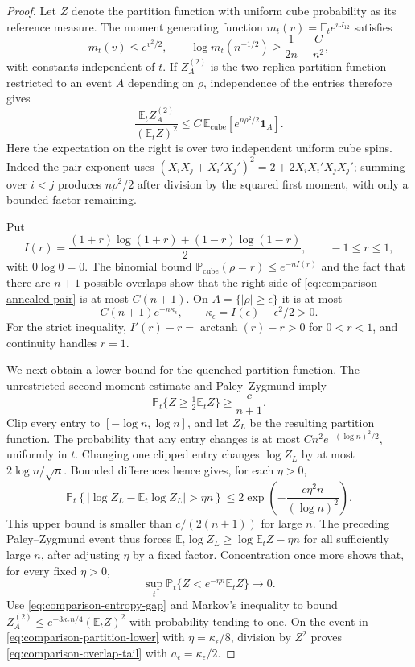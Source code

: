 \begin{proof}
Let $Z$ denote the partition function with uniform cube probability as its
reference measure.  The moment generating function
$m_t(v)=\mathbb E_t e^{vJ_{12}}$ satisfies
\[
 m_t(v)\le e^{v^2/2},\qquad
 \log m_t(n^{-1/2})\ge\frac1{2n}-\frac C{n^2},
\]
with constants independent of $t$.  If $Z_A^{(2)}$ is the two-replica
partition function restricted to an event $A$ depending on $\rho$, independence
of the entries therefore gives
\begin{equation}\label{eq:comparison-annealed-pair}
 \frac{\mathbb E_t Z_A^{(2)}}{(\mathbb E_tZ)^2}
 \le C\,\mathbb E_{\mathrm{cube}}\!\left[
             e^{n\rho^2/2}\mathbf1_A\right].
\end{equation}
Here the expectation on the right is over two independent uniform cube spins.
Indeed the pair exponent uses
$(X_iX_j+X_i'X_j')^2=2+2X_iX_i'X_jX_j'$; summing over $i<j$ produces
$n\rho^2/2$ after division by the squared first moment, with only a bounded
factor remaining.

Put
\[
 I(r)=\frac{(1+r)\log(1+r)+(1-r)\log(1-r)}2,
 \qquad -1\le r\le1,
\]
with $0\log0=0$.  The binomial bound
$\mathbb P_{\mathrm{cube}}(\rho=r)\le e^{-nI(r)}$ and the fact that there
are $n+1$ possible overlaps show that the right side of
\eqref{eq:comparison-annealed-pair} is at most $C(n+1)$.  On
$A=\{|\rho|\ge\epsilon\}$ it is at most
\begin{equation}\label{eq:comparison-entropy-gap}
 C(n+1)e^{-n\kappa_\epsilon},\qquad
 \kappa_\epsilon=I(\epsilon)-\epsilon^2/2>0.
\end{equation}
For the strict inequality, $I'(r)-r=\operatorname{arctanh}(r)-r>0$ for
$0<r<1$, and continuity handles $r=1$.

We next obtain a lower bound for the quenched partition function.  The
unrestricted second-moment estimate and Paley--Zygmund imply
\[
 \mathbb P_t\{Z\ge\tfrac12\mathbb E_t Z\}\ge\frac c{n+1}.
\]
Clip every entry to $[-\log n,\log n]$, and let $Z_L$ be the resulting
partition function.  The probability that any entry changes is at most
$Cn^2e^{-(\log n)^2/2}$, uniformly in $t$.  Changing one clipped entry
changes $\log Z_L$ by at most $2\log n/\sqrt n$.  Bounded differences hence
gives, for each $\eta>0$,
\[
 \mathbb P_t\left\{
   |\log Z_L-\mathbb E_t\log Z_L|>\eta n
 \right\}
 \le2\exp\!\left(-\frac{c\eta^2n}{(\log n)^2}\right).
\]
This upper bound is smaller than $c/(2(n+1))$ for large $n$.  The preceding
Paley--Zygmund event thus forces
$\mathbb E_t\log Z_L\ge\log\mathbb E_tZ-\eta n$ for all sufficiently
large $n$, after adjusting $\eta$ by a fixed factor.  Concentration once more
shows that, for every fixed $\eta>0$,
\begin{equation}\label{eq:comparison-partition-lower}
 \sup_t\mathbb P_t\{
       Z<e^{-\eta n}\mathbb E_tZ\}\longrightarrow0.
\end{equation}
Use \eqref{eq:comparison-entropy-gap} and Markov's inequality to bound
$Z_A^{(2)}\le e^{-3\kappa_\epsilon n/4}(\mathbb E_tZ)^2$ with probability
tending to one.  On the event in \eqref{eq:comparison-partition-lower} with
$\eta=\kappa_\epsilon/8$, division by $Z^2$ proves
\eqref{eq:comparison-overlap-tail} with $a_\epsilon=\kappa_\epsilon/2$.


\end{proof}
